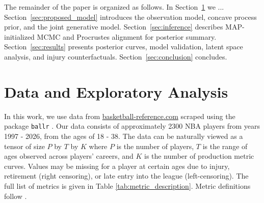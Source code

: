 \documentclass[aoas]{imsart}
\begin{document}

The remainder of the paper is organized as follows.  In Section~\ref{sec:data} we ...  Section~\ref{sec:proposed_model} introduces the observation model, concave process prior, and the joint generative model.  Section~\ref{sec:inference} describes MAP-initialized MCMC and Procrustes alignment for posterior summary.  Section~\ref{sec:results} presents posterior curves, model validation, latent space analysis, and injury counterfactuals.  Section~\ref{sec:conclusion} concludes.



\section{Data and Exploratory Analysis}

\label{sec:data}
In this work, we use data from \url{basketball-reference.com} \citep{bballref} scraped using the package \texttt{ballr} \citep{ballr}. Our data consists of approximately 2300 NBA players from years 1997 - 2026, from the ages of 18 - 38. The data can be naturally viewed as a  tensor of size $P$ by $T$ by $K$ where $P$ is the number of players, $T$ is the range of ages observed across players' careers, and $K$ is the number of production metric curves.   Values may be missing for a player at certain ages due to injury, retirement (right censoring), or late entry into the league (left-censoring). The full list of metrics is given in Table \ref{tab:metric_description}. Metric definitions follow \cite{terner2020modeling}. 
\end{document}
